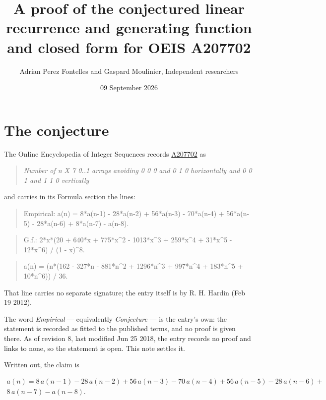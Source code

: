 \documentclass[11pt]{article}
\title{A proof of the conjectured linear recurrence and generating function and closed form for OEIS A207702}
\author{Adrian Perez Fontelles and Gaspard Moulinier, Independent researchers}
\date{09 September 2026}
\theoremstyle{definition}
\begin{document}
\maketitle
\section{The conjecture}

The Online Encyclopedia of Integer Sequences records \href{https://oeis.org/A207702}{A207702} as

\begin{quote}\itshape Number of n X 7 0..1 arrays avoiding 0 0 0 and 0 1 0 horizontally and 0 0 1 and 1 1 0 vertically\end{quote}

and carries in its Formula section the lines:

\begin{quote}\ttfamily Empirical: a(n) = 8*a(n-1) - 28*a(n-2) + 56*a(n-3) - 70*a(n-4) + 56*a(n-5) - 28*a(n-6) + 8*a(n-7) - a(n-8).\end{quote}

\begin{quote}\ttfamily G.f.: 2*x*(20 + 640*x + 775*x\textasciicircum{}2 - 1013*x\textasciicircum{}3 + 259*x\textasciicircum{}4 + 31*x\textasciicircum{}5 - 12*x\textasciicircum{}6) / (1 - x)\textasciicircum{}8.\end{quote}

\begin{quote}\ttfamily a(n) = (n*(162 - 327*n - 881*n\textasciicircum{}2 + 1296*n\textasciicircum{}3 + 997*n\textasciicircum{}4 + 183*n\textasciicircum{}5 + 10*n\textasciicircum{}6)) / 36.\end{quote}

That line carries no separate signature; the entry itself is by R. H. Hardin (Feb 19 2012).

The word {\itshape Empirical} --- equivalently {\itshape Conjecture} --- is the entry's own: the statement is recorded as fitted to the published terms, and no proof is given there. As of revision 8, last modified Jun 25 2018, the entry records no proof and links to none, so the statement is open. This note settles it.

Written out, the claim is

\begin{multline*} a(n) = 8\,a(n-1) - 28\,a(n-2) + 56\,a(n-3) - 70\,a(n-4) + 56\,a(n-5) - 28\,a(n-6) + \\ 8\,a(n-7) - a(n-8). \end{multline*}
\end{document}
